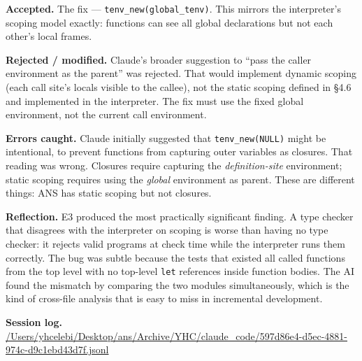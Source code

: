 \documentclass[11pt,a4paper]{article}
\newcommand{\field}[2]{\textbf{#1.} #2\par}
\newcommand{\sessionlog}[1]{\textbf{Session log.} \url{#1}\par}
\begin{document}
\field{Accepted}{The fix --- \texttt{tenv\_new(global\_tenv)}. This mirrors the interpreter's scoping model exactly: functions can see all global declarations but not each other's local frames.}
\field{Rejected / modified}{Claude's broader suggestion to ``pass the caller environment as the parent'' was rejected. That would implement dynamic scoping (each call site's locals visible to the callee), not the static scoping defined in \S4.6 and implemented in the interpreter. The fix must use the fixed global environment, not the current call environment.}
\field{Errors caught}{Claude initially suggested that \texttt{tenv\_new(NULL)} might be intentional, to prevent functions from capturing outer variables as closures. That reading was wrong. Closures require capturing the \emph{definition-site} environment; static scoping requires using the \emph{global} environment as parent. These are different things: ANS has static scoping but not closures.}
\field{Reflection}{E3 produced the most practically significant finding. A type checker that disagrees with the interpreter on scoping is worse than having no type checker: it rejects valid programs at check time while the interpreter runs them correctly. The bug was subtle because the tests that existed all called functions from the top level with no top-level \texttt{let} references inside function bodies. The AI found the mismatch by comparing the two modules simultaneously, which is the kind of cross-file analysis that is easy to miss in incremental development.}
\sessionlog{/Users/yhcelebi/Desktop/ans/Archive/YHC/claude_code/597d86e4-d5ec-4881-974c-d9c1ebd43d7f.jsonl}
\end{document}
